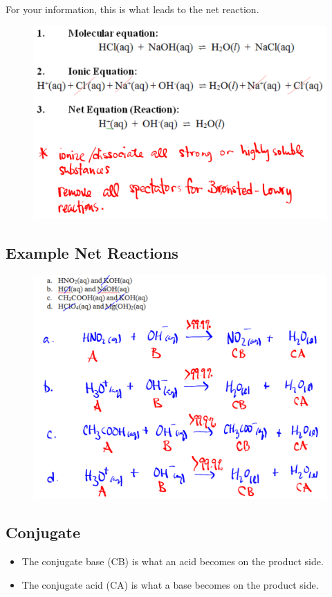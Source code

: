 \documentclass[a4paper,12pt]{article}
\begin{document}
For your information, this is what leads to the net reaction.
\begin{figure}[H]
    \includegraphics[width=\textwidth]{net}
\end{figure}

\subsection{Example Net Reactions}
\begin{figure}[H]
    \includegraphics[width=\textwidth]{equationex}
\end{figure}

\subsection{Conjugate}
\begin{itemize}
    \item{The conjugate base (CB) is what an acid becomes on the product side.}
    \item{The conjugate acid (CA) is what a base becomes on the product side.}
\end{itemize}
\end{document}
